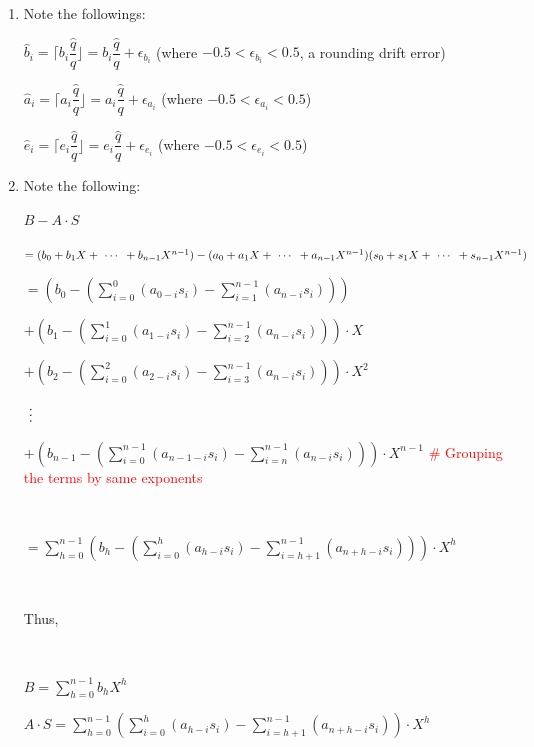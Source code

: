 \begin{enumerate}
\item Note the followings: 

$\hat{b}_i = \Big\lceil b_i \dfrac{\hat{q}}{q} \Big\rfloor = b_i\dfrac{\hat{q}}{q} + \epsilon_{b_i}$ (where $-0.5 < \epsilon_{b_i} < 0.5$, a rounding drift error)

$\hat{a}_i = \Big\lceil a_i \dfrac{\hat{q}}{q} \Big\rfloor = a_i\dfrac{\hat{q}}{q} + \epsilon_{a_i}$ (where $-0.5 < \epsilon_{a_i} < 0.5$)

$\hat{e}_i = \Big\lceil e_i \dfrac{\hat{q}}{q} \Big\rfloor = e_i\dfrac{\hat{q}}{q} + \epsilon_{e_i}$ (where $-0.5 < \epsilon_{e_i} < 0.5$)

\item Note the following: 


$B - A\cdot S$ 

$ = (b_0 + b_1X + \text{ } \text{$\cdots$} \text{ } + b_{n-1}X^{n-1} ) - (a_{0} + a_{1}X + \text{ } \text{$\cdots$} \text{ } + a_{n-1}X^{n-1})(s_{0} + s_{1}X + \text{ } \text{$\cdots$} \text{ } + s_{n-1}X^{n-1})$ 


$ = \left(b_0 - \left( \sum\limits_{i=0}^{0}(a_{0-i}s_{i}) - \sum\limits_{i=1}^{n-1}(a_{n-i}s_{i}) \right)\right)$

$ + \left(b_1 - \left( \sum\limits_{i=0}^{1}(a_{1-i}s_{i}) - \sum\limits_{i=2}^{n-1}(a_{n-i}s_{i})   \right) \right)\cdot X$ 



$ + \left(b_2 - \left( \sum\limits_{i=0}^{2}(a_{2-i}s_{i}) - \sum\limits_{i=3}^{n-1}(a_{n-i}s_{i})   \right) \right)\cdot X^2$ 


$\text{ } \text{$\vdots$} \text{ }$ 


$ + \left(b_{n-1} - \left(  \sum\limits_{i=0}^{n-1}(a_{n-1-i}s_{i}) -  \sum\limits_{i=n}^{n-1}(a_{n-i}s_{i})  \right) \right)\cdot X^{n-1}$ \textcolor{red}{\# Grouping the terms by same exponents}

$ $

$= \sum\limits_{h=0}^{n-1}  \left(b_h - \left( \sum\limits_{i=0}^{h}(a_{h-i}s_{i}) -  \sum\limits_{i=h+1}^{n-1}(a_{n+h-i}s_{i})  \right) \right)\cdot X^{h}  $

$ $

Thus,

$ $

$B = \sum\limits_{h=0}^{n-1}  b_h  X^{h}  $

$A\cdot S = \sum\limits_{h=0}^{n-1}  \left(\sum\limits_{i=0}^{h}(a_{h-i}s_{i}) - \sum\limits_{i=h+1}^{n-1}(a_{n+h-i}s_{i}) \right)\cdot X^{h}  $



\end{enumerate}
